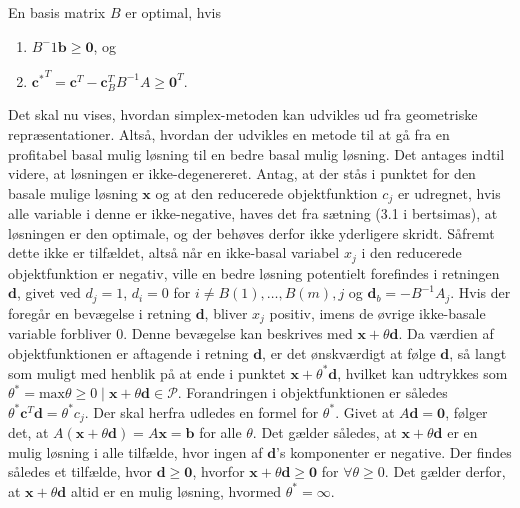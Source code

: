 %
%
\begin{defn}{}{}
En basis matrix $B$ er optimal, hvis
\begin{enumerate}[label = (\alph*)]
\item $B^-1 \mathbf{b} \geq \mathbf{0}$, og
\item ${\mathbf{c}^*}^T = \mathbf{c}^T - \mathbf{c}_B^T B^{-1} A \geq \mathbf{0}^T$.
\end{enumerate}
\end{defn}
\noindent
%
%
Det skal nu vises, hvordan simplex-metoden kan udvikles ud fra geometriske repræsentationer.
Altså, hvordan der udvikles en metode til at gå fra en profitabel basal mulig løsning til en bedre basal mulig løsning.
Det antages indtil videre, at løsningen er ikke-degenereret.
Antag, at der stås i punktet for den basale mulige løsning $\mathbf{x}$ og at den reducerede objektfunktion $c_j$ er udregnet, hvis alle variable i denne er ikke-negative, haves det fra sætning (3.1 i bertsimas), at løsningen er den optimale, og der behøves derfor ikke yderligere skridt.
Såfremt dette ikke er tilfældet, altså når en ikke-basal variabel $x_j$ i den reducerede objektfunktion er negativ, ville en bedre løsning potentielt forefindes i retningen $\mathbf{d}$, givet ved  $d_j=1$, $d_i=0$ for $i \neq B(1),\ldots,B(m),j$ og $\mathbf{d}_b=-B^{-1}A_j$.
Hvis der foregår en bevægelse i retning $\mathbf{d}$, bliver $x_j$ positiv, imens de øvrige ikke-basale variable forbliver $0$.
Denne bevægelse kan beskrives med $\mathbf{x}+\theta \mathbf{d}$. 
Da værdien af objektfunktionen er aftagende i retning $\mathbf{d}$, er det ønskværdigt at følge $\mathbf{d}$, så langt som muligt med henblik på at ende i punktet $\mathbf{x}+\theta^{*} \mathbf{d}$, hvilket kan udtrykkes som 
$\theta^{*}=\text{max} \theta \geq 0 \mid \mathbf{x}+\theta \mathbf{d} \in \mathcal{P}$.
Forandringen i objektfunktionen er således $\theta^{*}\mathbf{c}^T \mathbf{d}=\theta^{*}c_j$.
Der skal herfra udledes en formel for $\theta^{*}$.
Givet at $A\mathbf{d}=\mathbf{0}$, følger det, at $A(\mathbf{x}+\theta \mathbf{d})=A\mathbf{x}=\mathbf{b}$ for alle $\theta$.
Det gælder således, at $\mathbf{x}+\theta\mathbf{d}$ er en mulig løsning i alle tilfælde, hvor ingen af $\mathbf{d}$'s komponenter er negative.
Der findes således et tilfælde, hvor $\mathbf{d} \geq \mathbf{0}$, hvorfor $\mathbf{x} + \theta \mathbf{d} \geq \mathbf{0}$ for $\forall\theta \geq 0$. 
Det gælder derfor, at $\mathbf{x} + \theta \mathbf{d} $ altid er en mulig løsning, hvormed $\theta^*=\infty$. \\
